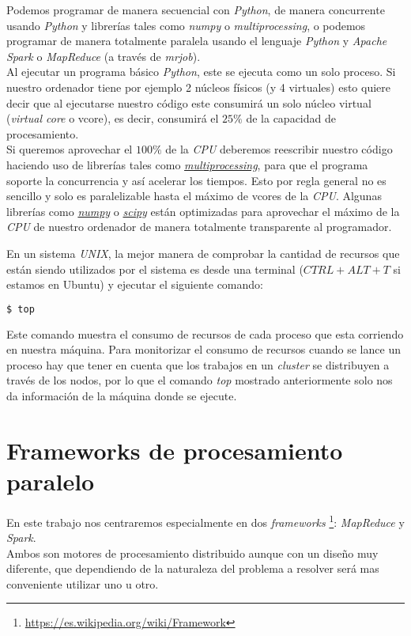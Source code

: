 Podemos programar de manera secuencial con \textit{Python}, de manera concurrente usando \textit{Python} y 
librerías tales como \textit{numpy} o \textit{multiprocessing}, o podemos programar de manera totalmente paralela
usando el lenguaje \textit{Python} y \textit{Apache Spark} o \textit{MapReduce} (a través de \textit{mrjob}).\\
Al ejecutar un programa básico \textit{Python}, este se ejecuta como un solo proceso. Si nuestro ordenador tiene 
por ejemplo 2 núcleos físicos (y 4 virtuales) esto quiere decir que al ejecutarse nuestro código 
este consumirá un solo núcleo virtual (\textit{virtual core} o vcore),
es decir, consumirá el $25\%$ de la capacidad de procesamiento.\\
Si queremos aprovechar el $100\% $ de la \textit{CPU} deberemos reescribir nuestro código haciendo uso de librerías 
tales como \href{https://docs.python.org/2/library/multiprocessing.html}{\textit{multiprocessing}}, 
para que el programa soporte la concurrencia y así acelerar los tiempos.
Esto por regla general no es sencillo y solo es paralelizable hasta el máximo de vcores de la \textit{CPU}. 
Algunas librerías como \href{http://www.numpy.org/}{\textit{numpy}} o 
\href{https://www.scipy.org/}{\textit{scipy}} están optimizadas para aprovechar el máximo 
de la \textit{CPU} de nuestro ordenador de manera totalmente transparente al programador.
\newline

En un sistema \textit{UNIX}, la mejor manera de comprobar la cantidad de recursos que están siendo utilizados 
por el sistema es desde una terminal ($CTRL + ALT + T$ si estamos en Ubuntu) y ejecutar el siguiente comando:

\begin{lstlisting}[language=bash, numbers=none]
$ top
\end{lstlisting}

Este comando muestra el consumo de recursos de cada proceso que esta corriendo en nuestra máquina.
Para monitorizar el consumo de recursos cuando se lance un proceso hay que tener en cuenta que los trabajos en 
un \textit{cluster} se distribuyen a través de los nodos, por lo que el comando \textit{top} mostrado anteriormente 
solo nos da información de la máquina donde se ejecute.

\clearpage

\section[Frameworks]{Frameworks de procesamiento paralelo}\label{sec:frameworks_procesamiento_paralelo}
En este trabajo nos centraremos especialmente en dos \textit{frameworks}
\footnote{\url{https://es.wikipedia.org/wiki/Framework}}: \textit{MapReduce} y \textit{Spark}. \\
Ambos son motores de procesamiento distribuido aunque con un diseño muy diferente, que dependiendo 
de la naturaleza del problema a resolver será mas conveniente utilizar uno u otro.

